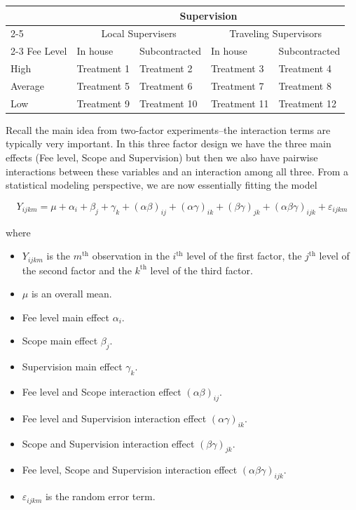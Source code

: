 \documentclass[
]{book}
\providecommand{\tightlist}{%
  \setlength{\itemsep}{0pt}\setlength{\parskip}{0pt}}
\begin{document}
\begin{table}
\centering
\begin{tabular}{l|l|l|l|l}
\hline
\multicolumn{1}{c|}{ } & \multicolumn{4}{c}{Supervision} \\
\cline{2-5}
\multicolumn{1}{c|}{ } & \multicolumn{2}{c|}{Local Supervisers} & \multicolumn{2}{c}{Traveling Supervisors} \\
\cline{2-3} \cline{4-5}
Fee Level & In house & Subcontracted & In house & Subcontracted\\
\hline
High & Treatment 1 & Treatment 2 & Treatment 3 & Treatment 4\\
\hline
Average & Treatment 5 & Treatment 6 & Treatment 7 & Treatment 8\\
\hline
Low & Treatment 9 & Treatment 10 & Treatment 11 & Treatment 12\\
\hline
\end{tabular}
\end{table}

Recall the main idea from two-factor experiments--the interaction terms are typically very important.
In this three factor design we have the three main effects (Fee level, Scope and Supervision) but then we also have pairwise interactions between these variables and an interaction among all three.
From a statistical modeling perspective, we are now essentially fitting the model

\[Y_{ijkm} = \mu + \alpha_i + \beta_j + \gamma_k + (\alpha\beta)_{ij} + (\alpha\gamma)_{ik} + (\beta\gamma)_{jk} + (\alpha\beta\gamma)_{ijk} + \varepsilon_{ijkm}\]

where

\begin{itemize}
\tightlist
\item
  \(Y_{ijkm}\) is the \(m^\mathrm{th}\) observation in the \(i^\mathrm{th}\) level of the first factor, the \(j^\mathrm{th}\) level of the second factor and the \(k^\mathrm{th}\) level of the third factor.
\item
  \(\mu\) is an overall mean.
\item
  Fee level main effect \(\alpha_i\).
\item
  Scope main effect \(\beta_j\).
\item
  Supervision main effect \(\gamma_k\).
\item
  Fee level and Scope interaction effect \((\alpha\beta)_{ij}\).
\item
  Fee level and Supervision interaction effect \((\alpha\gamma)_{ik}\).
\item
  Scope and Supervision interaction effect \((\beta\gamma)_{jk}\).
\item
  Fee level, Scope and Supervision interaction effect \((\alpha\beta\gamma)_{ijk}\).
\item
  \(\varepsilon_{ijkm}\) is the random error term.
\end{itemize}
\end{document}
